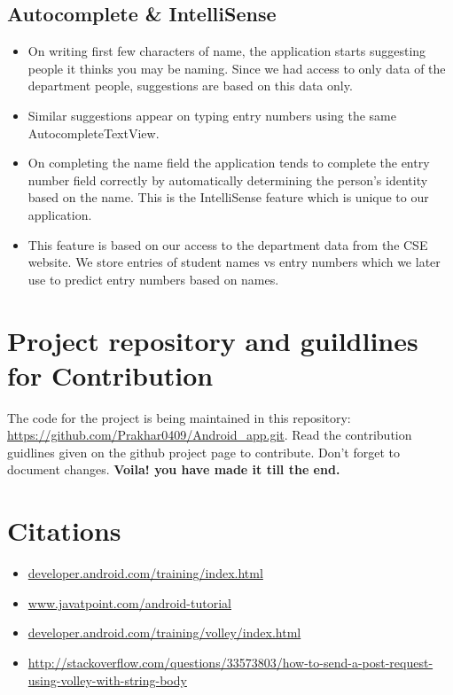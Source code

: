 \documentclass[12pt]{article}
\begin{document}
    
   
    
\subsection{Autocomplete \& IntelliSense}
\begin{itemize}
\item On writing first few characters of name, the application starts suggesting people it thinks you may be naming. Since we had access to only data of the department people, suggestions are based on this data only.
\item Similar suggestions appear on typing entry numbers using the same AutocompleteTextView.
\item On completing the name field the application tends to complete the entry number field correctly by automatically determining the person's identity based on the name. This is the IntelliSense feature which is unique to our application.
\item This feature is based on our access to the department data from the CSE website. We store entries of student names vs entry numbers which we later use to predict entry numbers based on names.
\end{itemize}

\section{Project repository and guildlines for Contribution}
\par The code for the project is being maintained in this repository: \url{ https://github.com/Prakhar0409/Android\_app.git}.
Read the contribution guidlines given on the github project page to contribute. Don't forget to document changes. 
\textbf{Voila! you have made it till the end.}

\section{Citations}
\begin{itemize}
\item \url{ developer.android.com/training/index.html}
\item \url{www.javatpoint.com/android-tutorial}
\item \url{developer.android.com/training/volley/index.html}
\item \url{http://stackoverflow.com/questions/33573803/how-to-send-a-post-request-using-volley-with-string-body}
\end{itemize}





\end{document}
